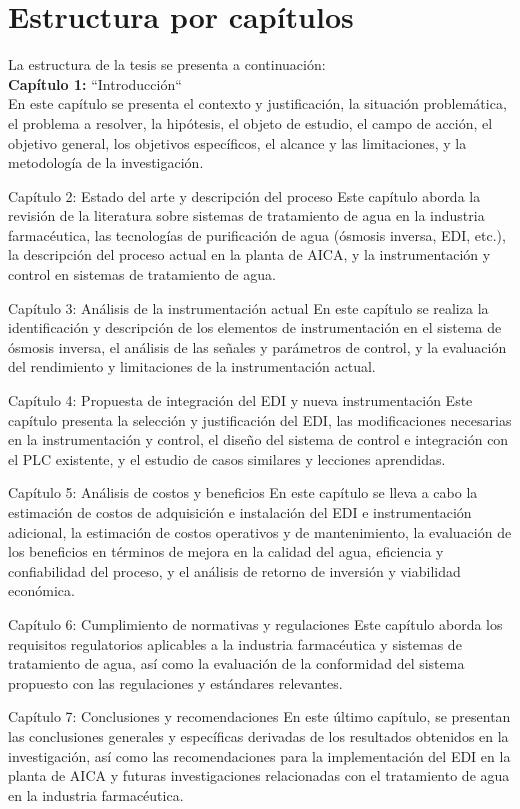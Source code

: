 \section{Estructura por capítulos}
La estructura de la tesis se presenta a continuación:\\
\textbf{Capítulo 1:}  ``Introducción``\\
En este capítulo se presenta el contexto y justificación, la situación problemática, el problema a resolver, la hipótesis, el objeto de estudio, el campo de acción, el objetivo general, los objetivos específicos, el alcance y las limitaciones, y la metodología de la investigación.



Capítulo 2: Estado del arte y descripción del proceso
Este capítulo aborda la revisión de la literatura sobre sistemas de tratamiento de agua en la industria farmacéutica, las tecnologías de purificación de agua (ósmosis inversa, EDI, etc.), la descripción del proceso actual en la planta de AICA, y la instrumentación y control en sistemas de tratamiento de agua.

Capítulo 3: Análisis de la instrumentación actual
En este capítulo se realiza la identificación y descripción de los elementos de instrumentación en el sistema de ósmosis inversa, el análisis de las señales y parámetros de control, y la evaluación del rendimiento y limitaciones de la instrumentación actual.

Capítulo 4: Propuesta de integración del EDI y nueva instrumentación
Este capítulo presenta la selección y justificación del EDI, las modificaciones necesarias en la instrumentación y control, el diseño del sistema de control e integración con el PLC existente, y el estudio de casos similares y lecciones aprendidas.

Capítulo 5: Análisis de costos y beneficios
En este capítulo se lleva a cabo la estimación de costos de adquisición e instalación del EDI e instrumentación adicional, la estimación de costos operativos y de mantenimiento, la evaluación de los beneficios en términos de mejora en la calidad del agua, eficiencia y confiabilidad del proceso, y el análisis de retorno de inversión y viabilidad económica.

Capítulo 6: Cumplimiento de normativas y regulaciones
Este capítulo aborda los requisitos regulatorios aplicables a la industria farmacéutica y sistemas de tratamiento de agua, así como la evaluación de la conformidad del sistema propuesto con las regulaciones y estándares relevantes.

Capítulo 7: Conclusiones y recomendaciones
En este último capítulo, se presentan las conclusiones generales y específicas derivadas de los resultados obtenidos en la investigación, así como las recomendaciones para la implementación del EDI en la planta de AICA y futuras investigaciones relacionadas con el tratamiento de agua en la industria farmacéutica.

